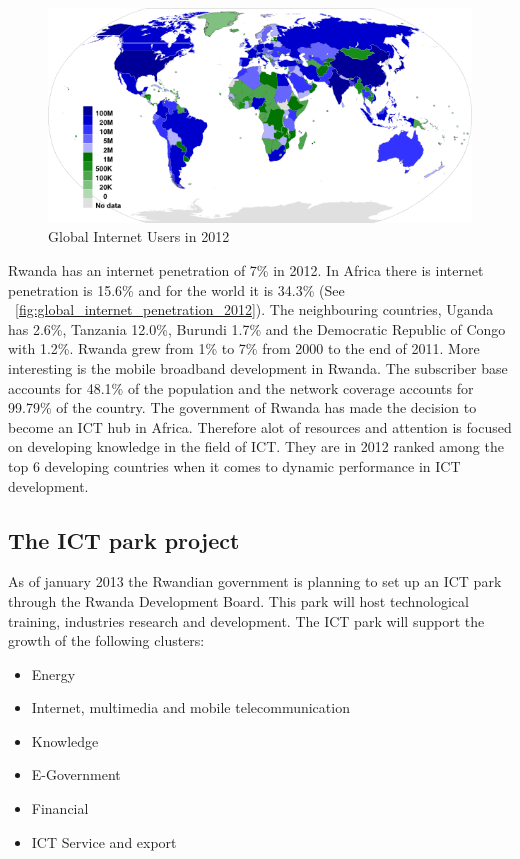 \begin{figure}
\centering
\includegraphics[width=12cm]{empirical/images/internet_users_2012}
\caption{Global Internet Users in 2012 \cite{3}}
\label{fig:global_internet_users_2012}
\end{figure}

Rwanda has an internet penetration of 7\% in 2012. In Africa there is internet penetration is 15.6\% and for the world it is 34.3\% (See ~\ref{fig:global_internet_penetration_2012}).
The neighbouring countries, Uganda has 2.6\%, Tanzania 12.0\%, Burundi 1.7\% and the Democratic Republic of Congo with 1.2\%\cite{4}. Rwanda grew from 1\% to 7\% from 2000 to the end of 2011\cite{2}.
More interesting is the mobile broadband development in Rwanda. The subscriber base accounts for 48.1\% of the population and the network coverage accounts for 99.79\% of the country.
The government of Rwanda has made the decision to become an ICT hub in Africa. Therefore alot of resources and attention is focused on developing knowledge in the field of ICT. 
They are in 2012 ranked among the top 6 developing countries when it comes to dynamic performance in ICT development\cite{5}.

\subsection{The ICT park project}
As of january 2013 the Rwandian government is planning to set up an ICT park through the Rwanda Development Board.
This park will host technological training, industries research and development. The ICT park will support the growth of the following clusters:
\begin{itemize}
\item Energy
\item Internet, multimedia and mobile telecommunication
\item Knowledge
\item E-Government
\item Financial
\item ICT Service and export
\end{itemize}
\cite{2}



